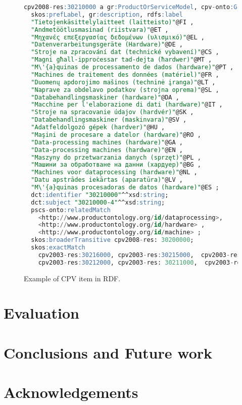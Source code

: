 \documentclass[preprint,12pt]{elsarticle}
\begin{document}
\begin{figure}[!ht]
\begin{lstlisting}[language=SQL,basicstyle=\ttfamily\footnotesize]  
cpv2008-res:30210000 a gr:ProductOrServiceModel, cpv-onto:Group;
  skos:prefLabel, gr:description, rdfs:label 	
  "Tietojenkäsittelylaitteet (laitteisto)"@FI ,
  "Andmetöötlusmasinad (riistvara)"@ET , 
  "Μηχανές επεξεργασίας δεδομένων (υλισμικό)"@EL , 
  "Datenverarbeitungsgeräte (Hardware)"@DE , 
  "Stroje na zpracování dat (technické vybavení)"@CS ,
  "Magni għall-ipproċessar tad-dejta (ħardwer)"@MT , 
  "M\'{a}quinas de processamento de dados (hardware)"@PT , 
  "Machines de traitement des données (matériel)"@FR ,
  "Duomenų apdorojimo mašinos (techninė įranga)"@LT , 
  "Naprave za obdelavo podatkov (strojna oprema)"@SL , 
  "Databehandlingsmaskiner (hardware)"@DA ,
  "Macchine per l'elaborazione di dati (hardware)"@IT ,
  "Stroje na spracovanie údajov (hardvér)"@SK , 
  "Databehandlingsmaskiner (maskinvara)"@SV ,
  "Adatfeldolgozó gépek (hardver)"@HU ,
  "Maşini de procesare a datelor (hardware)"@RO , 
  "Data-processing machines (hardware)"@GA ,
  "Data-processing machines (hardware)"@EN ,
  "Maszyny do przetwarzania danych (sprzęt)"@PL , 
  "Машини за обработване на данни (хардуер)"@BG ,
  "Machines voor dataprocessing (hardware)"@NL , 
  "Datu apstrādes iekārtas (aparatūra)"@LV ,
  "M\'{a}quinas procesadoras de datos (hardware)"@ES ;
  dct:identifier "30210000"^^xsd:string;
  dct:subject "30210000-4"^^xsd:string;
  pscs-onto:relatedMatch   
    <http://www.productontology.org/id/dataprocessing>,
    <http://www.productontology.org/id/hardware> ,
    <http://www.productontology.org/id/machine> ;	
  skos:broaderTransitive cpv2008-res: 30200000;
  skos:exactMatch 
    cpv2003-res:30216000, cpv2003-res:30215000,  cpv2003-res:30213000,   
    cpv2003-res:30212000, cpv2003-res: 30211000,  cpv2003-res:30214000.
\end{lstlisting}
\caption{Example of CPV item in RDF.}
 \label{fig:example-cpv-code}
\end{figure}



\section{Evaluation}\label{sect:evaluation}
\section{Conclusions and Future work}\label{sect:conclusions}
\section{Acknowledgements}

\clearpage



\end{document}
